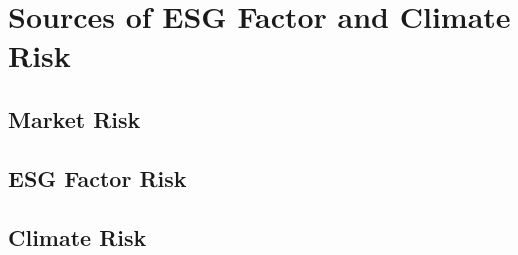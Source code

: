 \chapter{Sources of ESG Factor and Climate Risk}


\section{Market Risk}

\section{ESG Factor Risk}

\section{Climate Risk}